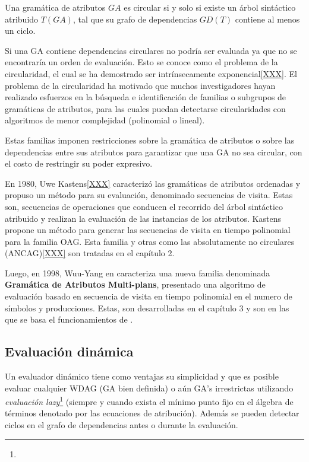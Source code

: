 \begin{definition} Una gramática de atributos $GA$ es circular si y solo si existe un árbol sintáctico atribuido $T(GA)$, tal que su grafo de dependencias $GD(T)$ contiene al menos un ciclo.
\end{definition}

Si una GA contiene dependencias circulares no podría ser evaluada ya que no se encontraría un orden de evaluación. Esto se conoce como el problema de la circularidad, el cual se ha demostrado ser intrínsecamente exponencial\ref{XXX}. El problema de la circularidad ha motivado que muchos investigadores hayan realizado esfuerzos en la búsqueda e identificación de familias o subgrupos de gramáticas de atributos, para las cuales puedan detectarse circularidades con algoritmos de menor complejidad (polinomial o lineal).

Estas familias imponen restricciones sobre la gramática de atributos o sobre las dependencias entre sus atributos para garantizar que una GA no sea circular, con el costo de restringir su poder expresivo.

En 1980, Uwe Kastens\ref{XXX} caracterizó las gramáticas de atributos ordenadas y propuso un método para su evaluación, denominado secuencias de visita. Estas son, secuencias de operaciones que conducen el recorrido del árbol sintáctico atribuido y realizan la evaluación de las instancias de los atributos. Kastens propone un método para generar las secuencias de visita en tiempo polinomial para la familia OAG. Esta familia y otras como las absolutamente no circulares (ANCAG)\ref{XXX} son tratadas en el capítulo 2.

Luego, en 1998, Wuu-Yang en \cite{wuu-yang1} caracteriza una nueva familia denominada \textbf{Gramática de Atributos Multi-plans}, presentado una algoritmo de evaluación basado en secuencia de visita en tiempo polinomial en el numero de símbolos y producciones. Estas, son desarrolladas en el capítulo 3 y son en las que se basa el funcionamientos de \maggen.  

\subsection{Evaluación dinámica}

Un evaluador dinámico tiene como ventajas su simplicidad y que es posible evaluar cualquier WDAG (GA bien definida) o aún GA’s irrestrictas utilizando \textit{evaluación lazy}\footnote{} (siempre y cuando exista el mínimo punto fijo en el álgebra de términos denotado por las ecuaciones de atribución). Además se pueden detectar ciclos en el grafo de dependencias antes o durante la evaluación.

